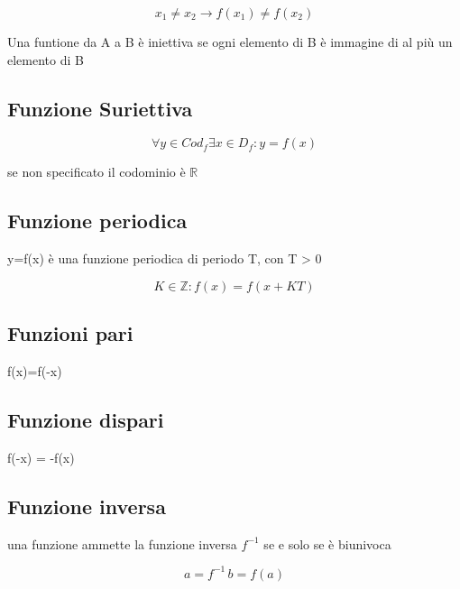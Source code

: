 \documentclass[a4paper,11pt]{article}
\begin{document}
\begin{center}
\[  
   x_1 \neq x_2 \rightarrow f(x_1) \neq f(x_2)
\]
\end{center}

Una funtione da A a B è iniettiva se ogni elemento di B è immagine di al più un elemento di B
 
\subsection{Funzione Suriettiva}

\begin{center}
    \[
    \forall y \in Cod_f \exists x \in D_f : y=f(x)
    \]
\end{center}
se non specificato il codominio è \( \mathbb{R }\)

\subsection{Funzione periodica}

y=f(x) è una funzione periodica di periodo T, con T > 0

\begin{center}
    \[
    K \in \mathbb{Z} : f(x) = f(x + KT)
    \]
\end{center}

\subsection{Funzioni pari}


\begin{center}
    f(x)=f(-x)
\end{center}

\subsection{Funzione dispari}

\begin{center}
    f(-x) = -f(x)
\end{center}

\subsection{Funzione inversa}
una funzione ammette la funzione inversa \( f^{-1} \) se e solo se è biunivoca 
\begin{center}
    \[
    a = f^{-1} \, b = f(a)
    \]
\end{center}
\end{document}
